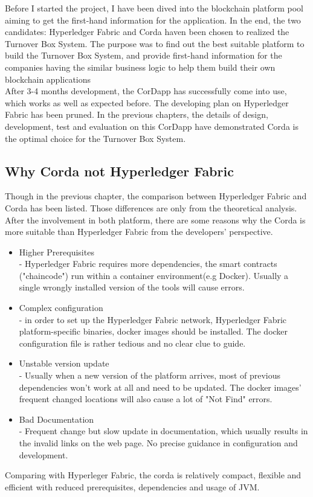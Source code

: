 Before I started the project, I have been dived into the blockchain platform pool aiming to get the first-hand information for the application. In the end, the two candidates: Hyperledger Fabric and Corda haven been chosen to realized the Turnover Box System. The purpose was to find out the best suitable platform to build the Turnover Box System, and provide first-hand information for the companies having the similar business logic to help them build their own blockchain applications\\

After 3-4 months development, the CorDapp has successfully come into use, which works as well as expected before. The developing plan on Hyperledger Fabric has been pruned. In the previous chapters, the details of design, development, test and evaluation on this CorDapp have demonstrated Corda is the optimal choice for the Turnover Box System.\\

 
\subsection{Why Corda not Hyperledger Fabric}
Though in the previous chapter, the comparison between Hyperledger Fabric and Corda has been listed. Those differences are only from the theoretical analysis. After the involvement in both platform, there are some reasons why the Corda is more suitable than Hyperledger Fabric from the developers' perspective.
\begin{itemize}
	\item Higher Prerequisites \\
	- Hyperledger Fabric requires more dependencies, the smart contracts ("chaincode") run within a container environment(e.g Docker). Usually a single wrongly installed version of the tools will cause errors.
	\item Complex configuration \\
	- in order to set up the Hyperledger Fabric network, Hyperledger Fabric platform-specific binaries, docker images should be installed. The docker configuration file is rather tedious and no clear clue to guide.
	\item Unstable version update \\
	- Usually when a new version of the platform arrives, most of previous dependencies won't work at all and need to be updated. The docker images' frequent changed locations will also cause a lot of "Not Find" errors.  
	\item Bad Documentation \\
	- Frequent change but slow update in documentation, which usually results in the invalid links on the web page. No precise guidance in configuration and development.
\end{itemize}
Comparing with Hyperleger Fabric, the corda is relatively compact, flexible and efficient with reduced prerequisites, dependencies and usage of JVM.

